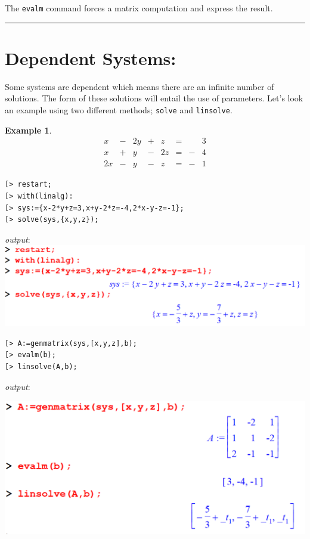 \documentclass[
]{book}
\theoremstyle{definition}
\theoremstyle{definition}
\newtheorem{example}{Example}[chapter]
\theoremstyle{definition}
\theoremstyle{definition}
\theoremstyle{remark}
\begin{document}
The \texttt{evalm} command forces a matrix computation and express the result.

\begin{center}\rule{0.5\linewidth}{0.5pt}\end{center}

\section{Dependent Systems:}\label{dependent-systems}

Some systems are dependent which means there are an infinite number of solutions. The form of these solutions will entail the use of parameters.
Let's look an example using two different methods; \texttt{solve} and \texttt{linsolve}.

\begin{example}
\protect\hypertarget{exm:unnamed-chunk-7}{}\label{exm:unnamed-chunk-7}\[
\begin{array}{ccccccccc}
x &-& 2y&+& z &=& &3\\
x &+& y &-& 2z&=&-&4\\
2x&-& y &-& z &=&-&1  
\end{array}
\]
\end{example}

\begin{verbatim}
[> restart;
[> with(linalg):
[> sys:={x-2*y+z=3,x+y-2*z=-4,2*x-y-z=-1};
[> solve(sys,{x,y,z});
\end{verbatim}

\emph{output}:
\includegraphics{figures/Lesson 5/fig9.png}

\begin{verbatim}
[> A:=genmatrix(sys,[x,y,z],b);
[> evalm(b);
[> linsolve(A,b);
\end{verbatim}

\emph{output}:

\includegraphics{figures/Lesson 5/fig10.png}
\end{document}
